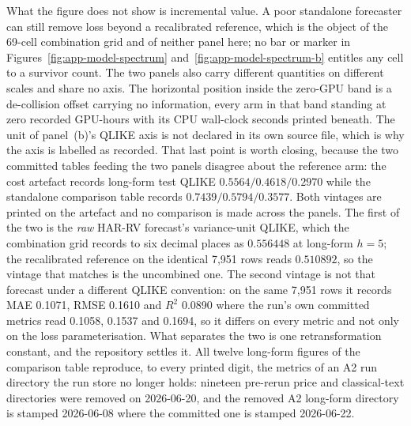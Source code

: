 What the figure does not show is incremental value. A poor standalone
forecaster can still remove loss beyond a recalibrated reference, which is the
object of the 69-cell combination grid and of neither panel here; no bar or
marker in Figures~\ref{fig:app-model-spectrum} and~\ref{fig:app-model-spectrum-b} entitles any cell to a survivor
count. The two panels also carry different quantities on different scales and
share no axis. The horizontal position inside the zero-GPU band is a
de-collision offset carrying no information, every arm in that band standing
at zero recorded GPU-hours with its CPU wall-clock seconds printed beneath.
The unit of panel~(b)'s QLIKE axis is not declared in its own source file,
which is why the axis is labelled as recorded. That last point is worth
closing, because the two committed tables feeding the two panels disagree
about the reference arm: the cost artefact records long-form test QLIKE
$0.5564/0.4618/0.2970$ while the standalone comparison table records
$0.7439/0.5794/0.3577$. %
Both vintages are printed on the artefact and no comparison is made across the
panels. The first of the two is the \emph{raw} HAR-RV forecast's variance-unit
QLIKE, which the combination grid records to six decimal places as $0.556448$
at long-form $h=5$; the recalibrated reference on the identical 7{,}951 rows
reads $0.510892$, so the vintage that matches is the uncombined one. The
second vintage is not that forecast under a different QLIKE convention: on the
same 7{,}951 rows it records MAE 0.1071, RMSE 0.1610 and $R^{2}$ 0.0890 where
the run's own committed metrics read 0.1058, 0.1537 and 0.1694, so it differs
on every metric and not only on the loss parameterisation. What separates the
two is one retransformation constant, and the repository settles it. All twelve
long-form figures of the comparison table reproduce, to every printed digit,
the metrics of an A2 run directory the run store no longer holds: nineteen
pre-rerun price and classical-text directories were removed on 2026-06-20, and
the removed A2 long-form directory is stamped 2026-06-08 where the committed
one is stamped 2026-06-22. %
